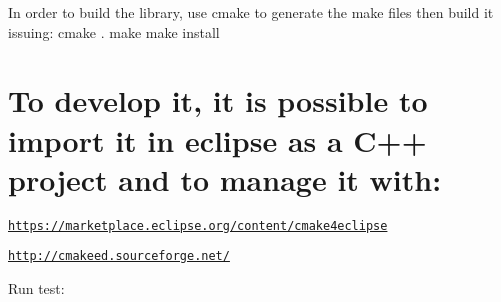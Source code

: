 In order to build the library, use cmake to generate the make files then build it issuing\+: cmake . make make install

\section*{To develop it, it is possible to import it in eclipse as a C++ project and to manage it with\+:}


\begin{DoxyItemize}
\item \href{https://marketplace.eclipse.org/content/cmake4eclipse}{\tt https\+://marketplace.\+eclipse.\+org/content/cmake4eclipse}
\item \href{http://cmakeed.sourceforge.net/}{\tt http\+://cmakeed.\+sourceforge.\+net/}
\end{DoxyItemize}

Run test\+: 